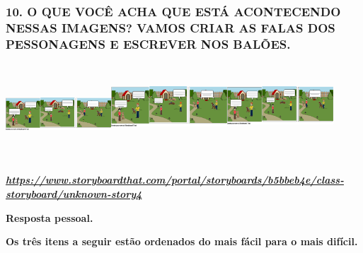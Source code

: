 \begin{escola}
\subsubsection[10. O QUE VOCÊ ACHA QUE ESTÁ ACONTECENDO NESSAS IMAGENS?
VAMOS CRIAR AS FALAS DOS PESSONAGENS E ESCREVER NOS
BALÕES.]{\texorpdfstring{10. O QUE VOCÊ ACHA QUE ESTÁ ACONTECENDO NESSAS
IMAGENS? VAMOS CRIAR AS FALAS DOS PESSONAGENS E ESCREVER NOS
BALÕES.\protect\includegraphics[width=1.55139in,height=1.32153in]{media/image177.png}\protect\includegraphics[width=1.70417in,height=1.53958in]{media/image178.png}\protect\includegraphics[width=1.56667in,height=1.56736in]{media/image179.png}}{10. O QUE VOCÊ ACHA QUE ESTÁ ACONTECENDO NESSAS IMAGENS? VAMOS CRIAR AS FALAS DOS PESSONAGENS E ESCREVER NOS BALÕES.}}\label{o-que-vocuxea-acha-que-estuxe1-acontecendo-nessas-imagens-vamos-criar-as-falas-dos-pessonagens-e-escrever-nos-baluxf5es.}

\href{https://www.storyboardthat.com/portal/storyboards/b5bbeb4e/class-storyboard/unknown-story4}{\textbf{\emph{https://www.storyboardthat.com/portal/storyboards/b5bbeb4e/class-storyboard/unknown-story4}}}

\textbf{Resposta pessoal.}


\textbf{Os três itens a seguir estão ordenados do mais fácil para o mais
difícil. }


\end{escola}
